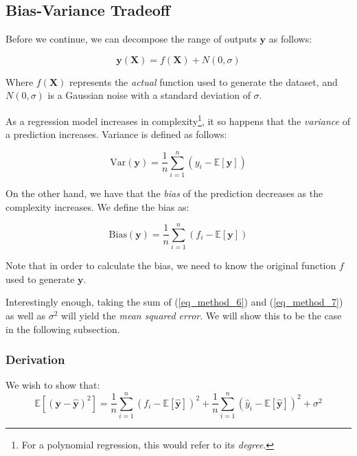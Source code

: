 \documentclass[a4paper,10pt,english]{article}
\begin{document}
\subsection*{Bias-Variance Tradeoff}

Before we continue, we can decompose the range of outputs $\mathbf{y}$ as follows:

\begin{equation}
\label{eq_method_5}
\mathbf{y}(\mathbf{X}) = f(\mathbf{X}) + N(0, \sigma) 
\end{equation}

Where $f(\mathbf{X})$ represents the \textit{actual} function used to generate the dataset, and $N(0,\sigma)$ is a Gaussian noise with a standard deviation of $\sigma$.

As a regression model increases in complexity\footnote{For a polynomial regression, this would refer to its \textit{degree}.}, it so happens that the \textit{variance} of a prediction increases.  Variance is defined as follows:

\begin{equation}
\label{eq_method_6}
\text{Var}(\mathbf{y}) = \frac{1}{n} \sum_{i=1}^{n} (y_i - \mathbb{E}[\mathbf{y}] )
\end{equation}

On the other hand, we have that the \textit{bias} of the prediction decreases as the complexity increases.  We define the bias as:

\begin{equation}
\label{eq_method_7}
\text{Bias}(\mathbf{y}) = \frac{1}{n} \sum_{i=1}^{n} (f_i - \mathbb{E}[\mathbf{y}] )
\end{equation}

Note that in order to calculate the bias, we need to know the original function $f$ used to generate $\mathbf{y}$.

Interestingly enough, taking the sum of (\ref{eq_method_6}) and (\ref{eq_method_7}) as well as $\sigma^2$ will yield the \textit{mean squared error}.  We will show this to be the case in the following subsection.

\subsubsection*{Derivation}

We wish to show that:
\begin{equation}
\label{eq_method_8}
\mathbb{E}\left[(\mathbf{y}-\hat{\mathbf{y}})^{2}\right]
=\frac{1}{n} \sum_{i=1}^{n}(f_{i}-\mathbb{E}[\hat{\mathbf{y}}])^{2}+\frac{1}{n} \sum_{i=1}^{n}(\hat{y}_{i}-\mathbb{E}[\hat{\mathbf{y}}])^{2}+\sigma^{2}
\end{equation}
\end{document}
